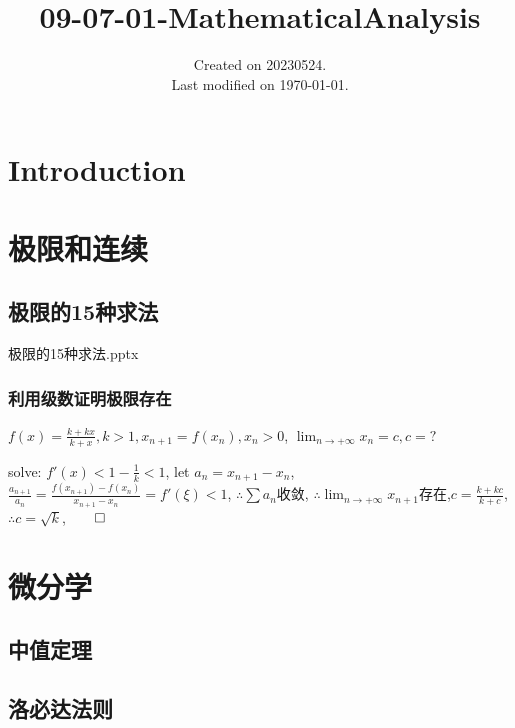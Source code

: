 \documentclass[UTF8]{../../09-Mathematics}
\begin{document}
\title{09-07-01-MathematicalAnalysis}
\date{Created on 20230524.\\   Last modified on \today.}
\maketitle
\tableofcontents


\chapter{Introduction}






\chapter{极限和连续}




\section{极限的15种求法}

极限的15种求法.pptx




\subsection{利用级数证明极限存在}


\begin{question}
    $f(x) = \frac{k+kx}{k+x}, k>1, x_{n+1}=f(x_n),x_n>0$, $\lim_{n\to+\infty}x_n =c,c=? $

    solve: $f'(x)<1-\frac{1}{k}<1$, let $a_n =x_{n+1}-x_{n}$, $\frac{a_{n+1}}{a_{n}}=  \frac{f(x_{n+1})-f(x_{n})}{x_{n+1}-x_{n}}=f'(\xi )<1$, $\therefore \sum a_n$收敛, $\therefore \lim_{n\to+\infty}x_{n+1} $存在,$c=\frac{k+kc}{k+c}$,$\therefore c=\sqrt{k} $,$\qed$
\end{question} 


\chapter{微分学}

\section{中值定理}
\section{洛必达法则}
\end{document}
